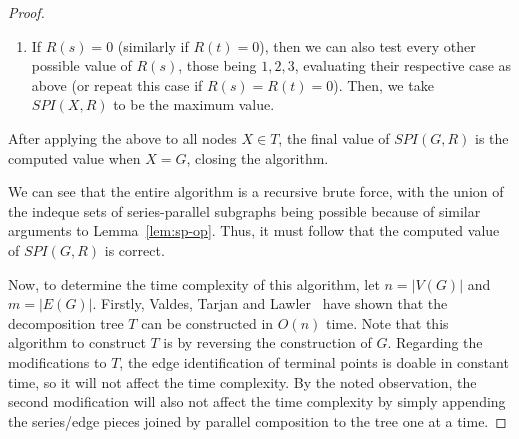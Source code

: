 \documentclass{article}
\begin{document}
\begin{proof}
\begin{enumerate}[label=\textbf{Case \arabic*.},leftmargin=*]
On top of this, define $R_i: V(X) \to \{0,1,2,3\}$ to share the same mapping as $R$ except that $R_i(s) = R_i(v_i) = R_i(t) = 2$, and define $R'_i$ similarly except $R'_i(v_i) = 1$. Then, over all $1 \leq i \leq k$, we can compute $$SPI(G_i, R_i) + SPI(P_i, R_i) + SPI(Q_i,R_i) + \sum_{j = 1}^{i - 1}(SPI(P_j, R'_j) + SPI(Q_j, R'_j) - 2) - 3,$$ with the subtracted parts accounting for over-counted terminal vertices. %
    
After evaluating this special case, redefine $(G_1, s,t)$ and $(G_2, s,t)$ to be the two-terminal series-parallel graphs where $X = G_1 \parallel G_2$. As this case can be handled very similarly as in Case $2$ except on both terminal vertexes, let $R_0,R_1,R_2,R_3 = R$ where $R_0(s)=R_0(t)=R_1(s)=R_2(t)=2$ and $R_1(t)=R_2(s)=R_3(s)=R_3(t) = 3$. Finally, compute $$\max_{0\leq i\leq 3}(SPI(G_1, R_i) + SPI(G_2, R_{4-i}) - I_{R_i}(s) - I_{R_i}(t)).$$ %

Between both subcases, take $SPI(X, R)$ to be the maximum value that was computed.
\item If $R(s) = 0$ (similarly if $R(t) = 0$), then we can also test every other possible value of $R(s)$, those being $1, 2, 3$, evaluating their respective case as above (or repeat this case if $R(s) = R(t) = 0$). Then, we take $SPI(X, R)$ to be the maximum value.
\end{enumerate}

After applying the above to all nodes $X \in T$, the final value of $SPI(G, R)$ is the computed value when $X = G$, closing the algorithm.
 
We can see that the entire algorithm is a recursive brute force, with the union of the indeque sets of series-parallel subgraphs being possible because of similar arguments to Lemma~\ref{lem:sp-op}. Thus, it must follow that the computed value of $SPI(G, R)$ is correct.

Now, to determine the time complexity of this algorithm, let $n = |V(G)|$ and $m = |E(G)|$. Firstly, Valdes, Tarjan and Lawler~\cite{VTL} have shown that the decomposition tree $T$ can be constructed in $O(n)$ time. Note that this algorithm to construct $T$ is by reversing the construction of $G$. Regarding the modifications to $T$, the edge identification of terminal points is doable in constant time, so it will not affect the time complexity. By the noted observation, the second modification will also not affect the time complexity by simply appending the series/edge pieces joined by parallel composition to the tree one at a time. %


\end{proof}
\end{document}
